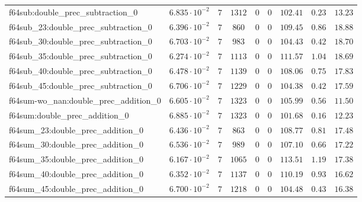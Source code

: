 \begin{tabular}{|l|c|c|c|c|c|c|c|c|}
f64sub:double\_prec\_subtraction\_0            & $ 6.835 \cdot 10^{-2} $ & $ 7      $ & $ 1312   $ & $ 0   $ & $ 0   $ & $ 102.41      $ & $ 0.23    $ & $ 13.23   $ \\
f64sub\_23:double\_prec\_subtraction\_0        & $ 6.396 \cdot 10^{-2} $ & $ 7      $ & $ 860    $ & $ 0   $ & $ 0   $ & $ 109.45      $ & $ 0.86    $ & $ 18.88   $ \\
f64sub\_30:double\_prec\_subtraction\_0        & $ 6.703 \cdot 10^{-2} $ & $ 7      $ & $ 983    $ & $ 0   $ & $ 0   $ & $ 104.43      $ & $ 0.42    $ & $ 18.70   $ \\
f64sub\_35:double\_prec\_subtraction\_0        & $ 6.274 \cdot 10^{-2} $ & $ 7      $ & $ 1113   $ & $ 0   $ & $ 0   $ & $ 111.57      $ & $ 1.04    $ & $ 18.69   $ \\
f64sub\_40:double\_prec\_subtraction\_0        & $ 6.478 \cdot 10^{-2} $ & $ 7      $ & $ 1139   $ & $ 0   $ & $ 0   $ & $ 108.06      $ & $ 0.75    $ & $ 17.83   $ \\
f64sub\_45:double\_prec\_subtraction\_0        & $ 6.706 \cdot 10^{-2} $ & $ 7      $ & $ 1229   $ & $ 0   $ & $ 0   $ & $ 104.38      $ & $ 0.42    $ & $ 17.59   $ \\
f64sum-wo\_nan:double\_prec\_addition\_0       & $ 6.605 \cdot 10^{-2} $ & $ 7      $ & $ 1323   $ & $ 0   $ & $ 0   $ & $ 105.99      $ & $ 0.56    $ & $ 11.50   $ \\
f64sum:double\_prec\_addition\_0               & $ 6.885 \cdot 10^{-2} $ & $ 7      $ & $ 1323   $ & $ 0   $ & $ 0   $ & $ 101.68      $ & $ 0.16    $ & $ 12.23   $ \\
f64sum\_23:double\_prec\_addition\_0           & $ 6.436 \cdot 10^{-2} $ & $ 7      $ & $ 863    $ & $ 0   $ & $ 0   $ & $ 108.77      $ & $ 0.81    $ & $ 17.48   $ \\
f64sum\_30:double\_prec\_addition\_0           & $ 6.536 \cdot 10^{-2} $ & $ 7      $ & $ 989    $ & $ 0   $ & $ 0   $ & $ 107.10      $ & $ 0.66    $ & $ 17.22   $ \\
f64sum\_35:double\_prec\_addition\_0           & $ 6.167 \cdot 10^{-2} $ & $ 7      $ & $ 1065   $ & $ 0   $ & $ 0   $ & $ 113.51      $ & $ 1.19    $ & $ 17.38   $ \\
f64sum\_40:double\_prec\_addition\_0           & $ 6.352 \cdot 10^{-2} $ & $ 7      $ & $ 1137   $ & $ 0   $ & $ 0   $ & $ 110.19      $ & $ 0.93    $ & $ 16.62   $ \\
f64sum\_45:double\_prec\_addition\_0           & $ 6.700 \cdot 10^{-2} $ & $ 7      $ & $ 1218   $ & $ 0   $ & $ 0   $ & $ 104.48      $ & $ 0.43    $ & $ 16.38   $ \\

\end{tabular}
